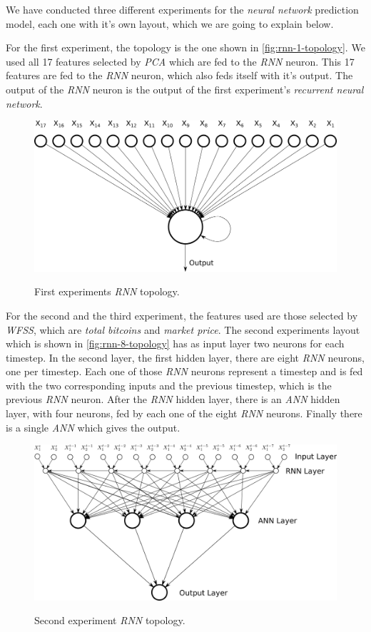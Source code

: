 We have conducted three different experiments for the \textit{neural
network} prediction model, each one with it's own layout, which we are
going to explain below.

For the first experiment, the topology is the one shown in
\autoref{fig:rnn-1-topology}. We used all 17 features selected by
\textit{PCA} which are fed to the \textit{RNN} neuron. This 17
features are fed to the \textit{RNN} neuron, which also feds itself
with it's output. The output of the \textit{RNN} neuron is the output
of the first experiment's \textit{recurrent neural network}.

\begin{figure}[bth] \myfloatalign
  {
    \includegraphics[width=1\linewidth]
    {gfx/rnn_1_topology}
  }
  \caption{First experiments \textit{RNN} topology.}
  \label{fig:rnn-1-topology}
\end{figure}

For the second and the third experiment, the features used are those
selected by \textit{WFSS}, which are \textit{total bitcoins} and
\textit{market price}. The second experiments layout which is shown in
\autoref{fig:rnn-8-topology} has as input layer two neurons for each
timestep. In the second layer, the first hidden layer, there are eight
\textit{RNN} neurons, one per timestep. Each one of those \textit{RNN}
neurons represent a timestep and is fed with the two corresponding
inputs and the previous timestep, which is the previous \textit{RNN}
neuron. After the \textit{RNN} hidden layer, there is an \textit{ANN}
hidden layer, with four neurons, fed by each one of the eight
\textit{RNN} neurons. Finally there is a single \textit{ANN} which
gives the output.

\begin{figure}[bth]
  \myfloatalign
  {
    \includegraphics[width=1\linewidth]
    {gfx/rnn_8_topology}}
  \caption{Second experiment \textit{RNN} topology.}
  \label{fig:rnn-8-topology}
\end{figure}

